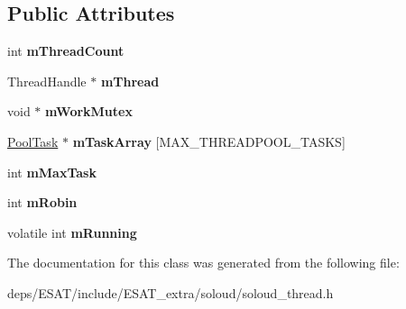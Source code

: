 \subsection*{Public Attributes}
\begin{DoxyCompactItemize}
\item 
\mbox{\label{class_so_loud_1_1_thread_1_1_pool_aff7a689de8e7831fab6b1496f97016dd}} 
int {\bfseries m\+Thread\+Count}
\item 
\mbox{\label{class_so_loud_1_1_thread_1_1_pool_a445d8cdf6c314538cbe47f36f088e112}} 
Thread\+Handle $\ast$ {\bfseries m\+Thread}
\item 
\mbox{\label{class_so_loud_1_1_thread_1_1_pool_a257fdfeb3ecfcdb93b60f948a0ddb1c9}} 
void $\ast$ {\bfseries m\+Work\+Mutex}
\item 
\mbox{\label{class_so_loud_1_1_thread_1_1_pool_a7a0beae198e4de16e49b17110f935935}} 
\mbox{\hyperlink{class_so_loud_1_1_thread_1_1_pool_task}{Pool\+Task}} $\ast$ {\bfseries m\+Task\+Array} \mbox{[}M\+A\+X\+\_\+\+T\+H\+R\+E\+A\+D\+P\+O\+O\+L\+\_\+\+T\+A\+S\+KS\mbox{]}
\item 
\mbox{\label{class_so_loud_1_1_thread_1_1_pool_a457c4430ce72c07abadcc14a8330325b}} 
int {\bfseries m\+Max\+Task}
\item 
\mbox{\label{class_so_loud_1_1_thread_1_1_pool_aeef706e198f929175731b02163499e9e}} 
int {\bfseries m\+Robin}
\item 
\mbox{\label{class_so_loud_1_1_thread_1_1_pool_a5577710eeb7c2dc51a5a3118734e815b}} 
volatile int {\bfseries m\+Running}
\end{DoxyCompactItemize}


The documentation for this class was generated from the following file\+:\begin{DoxyCompactItemize}
\item 
deps/\+E\+S\+A\+T/include/\+E\+S\+A\+T\+\_\+extra/soloud/soloud\+\_\+thread.\+h\end{DoxyCompactItemize}
